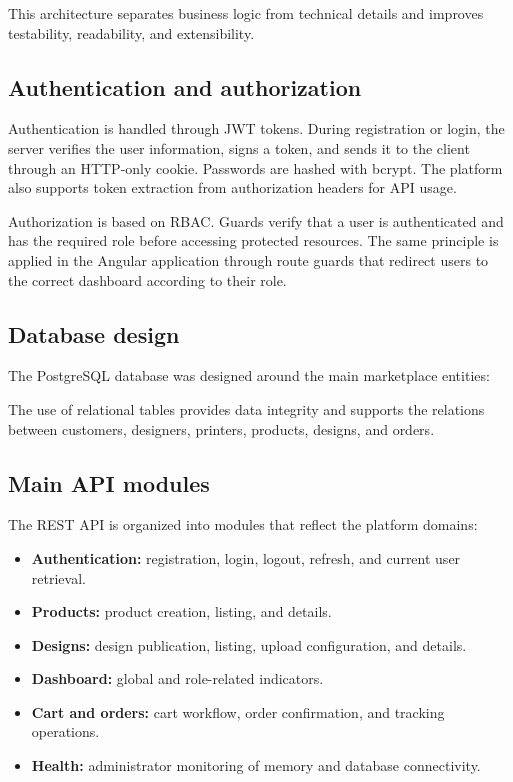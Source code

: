 This architecture separates business logic from technical details and improves testability, readability, and extensibility.

\subsection{Authentication and authorization}
Authentication is handled through JWT tokens.
During registration or login, the server verifies the user information, signs a token, and sends it to the client through an HTTP-only cookie.
Passwords are hashed with bcrypt.
The platform also supports token extraction from authorization headers for API usage.

Authorization is based on RBAC. Guards verify that a user is authenticated and has the required role before accessing protected resources.
The same principle is applied in the Angular application through route guards that redirect users to the correct dashboard according to their role.

\pagebreak
\subsection{Database design}
The PostgreSQL database was designed around the main marketplace entities:

The use of relational tables provides data integrity and supports the relations between customers, designers, printers, products, designs, and orders.

\subsection{Main API modules}
The REST API is organized into modules that reflect the platform domains:

\begin{itemize}
    \item \textbf{Authentication:} registration, login, logout, refresh, and current user retrieval.
    \item \textbf{Products:} product creation, listing, and details.
    \item \textbf{Designs:} design publication, listing, upload configuration, and details.
    \item \textbf{Dashboard:} global and role-related indicators.
    \item \textbf{Cart and orders:} cart workflow, order confirmation, and tracking operations.
    \item \textbf{Health:} administrator monitoring of memory and database connectivity.
\end{itemize}

